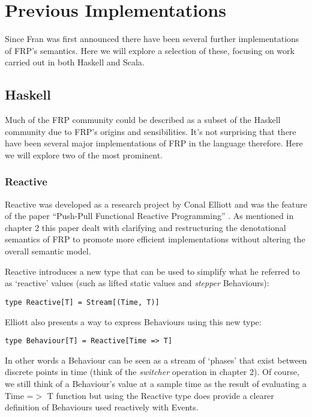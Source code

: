 \chapter{Previous Implementations}
  Since Fran was first announced there have been several further implementations of FRP's semantics. Here
  we will explore a selection of these, focusing on work carried out in both Haskell and Scala.
  
  \section{Haskell}
    Much of the FRP community could be described as a subset of the Haskell community due to FRP's
    origins and sensibilities. It's not surprising that there have been several major implementations
    of FRP in the language therefore. Here we will explore two of the most prominent.
    
    \subsection{Reactive}
      Reactive was developed as a research project by Conal Elliott and was the feature
      of the paper ``Push-Pull Functional Reactive Programming'' \cite{Elliott2009}. As mentioned
      in chapter 2 this paper dealt with clarifying and restructuring the denotational
      semantics of FRP
      to promote more efficient implementations without altering the overall semantic model.
      
      Reactive introduces a new type that can be used to simplify what he referred to as
      `reactive' values (such as lifted static values and \emph{stepper} Behaviours):
    
\begin{verbatim}
type Reactive[T] = Stream[(Time, T)]
\end{verbatim}

      Elliott also presents a way to express Behaviours using this new type:
      
\begin{verbatim}
type Behaviour[T] = Reactive[Time => T]
\end{verbatim}      

      In other words a Behaviour can be seen as a stream of `phases' that exist between discrete
      points in time (think of the \emph{switcher} operation in chapter 2). Of course, we
      still think of a Behaviour's value at a sample time as the result of evaluating a
      Time =$>$ T function but using the Reactive type
      does provide a clearer definition of Behaviours used reactively with Events.
      
